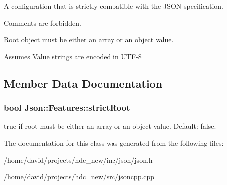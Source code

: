 A configuration that is strictly compatible with the J\+S\+ON specification. 


\begin{DoxyItemize}
\item Comments are forbidden.
\item Root object must be either an array or an object value.
\item Assumes \hyperlink{class_json_1_1_value}{Value} strings are encoded in U\+T\+F-\/8 
\end{DoxyItemize}

\subsection{Member Data Documentation}
\subsubsection[{\texorpdfstring{strict\+Root\+\_\+}{strictRoot_}}]{\setlength{\rightskip}{0pt plus 5cm}bool Json\+::\+Features\+::strict\+Root\+\_\+}\hypertarget{class_json_1_1_features_a1162c37a1458adc32582b585b552f9c3}{}\label{class_json_1_1_features_a1162c37a1458adc32582b585b552f9c3}
{\ttfamily true} if root must be either an array or an object value. Default\+: {\ttfamily false}. 

The documentation for this class was generated from the following files\+:\begin{DoxyCompactItemize}
\item 
/home/david/projects/hdc\+\_\+new/inc/json/json.\+h\item 
/home/david/projects/hdc\+\_\+new/src/jsoncpp.\+cpp\end{DoxyCompactItemize}
